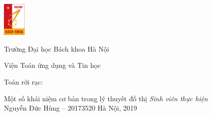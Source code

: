 \documentclass[14pt]{extarticle}
\begin{document}
\begin{titlepage}
\begin{minipage}[c]{4em}
	\includegraphics[width=3em]{resources/bk.jpg}
\end{minipage}
\begin{minipage}[]{\textwidth - 4em}
	\LARGE Trường Đại học Bách khoa Hà Nội\par
	\Large Viện Toán ứng dụng và Tin học
\end{minipage}
\begin{flushright}
	\vfill
	{\Large Toán rời rạc:}
	\par
	{\LARGE	Một số khái niệm cơ bản trong lý thuyết đồ thị}
	\vfill
	\textit{Sinh viên thực hiện}\\
	Nguyễn Đức Hùng -- 20173520
	\vfill
	Hà Nội, 2019
\end{flushright}
\end{titlepage}
\end{document}

